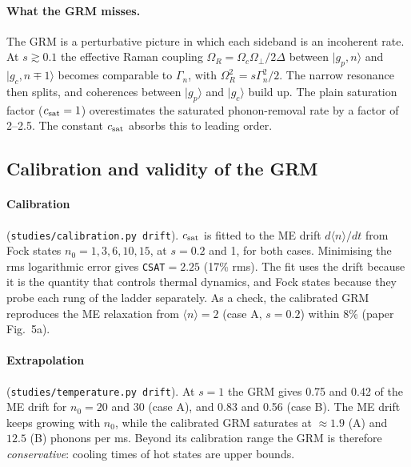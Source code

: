 \documentclass[11pt,a4paper]{article}
\newcommand{\ket}[1]{|#1\rangle}
\newcommand{\gp}{\ket{g_p}}
\newcommand{\gc}{\ket{g_c}}
\newcommand{\Om}{\Omega}
\newcommand{\code}[1]{\texttt{#1}}
\begin{document}
\paragraph{What the GRM misses.} The GRM is a perturbative picture in which each sideband is an incoherent rate. At $s\gtrsim0.1$ the effective Raman coupling $\Om_R=\Om_c\Om_\perp/2\Delta$ between $\ket{g_p,n}$ and $\ket{g_c,n\mp1}$ becomes comparable to $\Gamma_n$, with $\Om_R^2=s\Gamma_n^2/2$. The narrow resonance then splits, and coherences between $\gp$ and $\gc$ build up. The plain saturation factor ($c_{\rm sat}=1$) overestimates the saturated phonon-removal rate by a factor of 2--2.5. The constant $c_{\rm sat}$ absorbs this to leading order.

\subsection{Calibration and validity of the GRM}
\label{sec:calib}
\paragraph{Calibration} (\code{studies/calibration.py drift}). $c_{\rm sat}$ is fitted to the ME drift $d\langle n\rangle/dt$ from Fock states $n_0=1,3,6,10,15$, at $s=0.2$ and 1, for both cases. Minimising the rms logarithmic error gives \code{CSAT}$=2.25$ (17\% rms). The fit uses the drift because it is the quantity that controls thermal dynamics, and Fock states because they probe each rung of the ladder separately. As a check, the calibrated GRM reproduces the ME relaxation from $\langle n\rangle=2$ (case A, $s=0.2$) within 8\% (paper Fig.~5a).

\paragraph{Extrapolation} (\code{studies/temperature.py drift}). At $s=1$ the GRM gives 0.75 and 0.42 of the ME drift for $n_0=20$ and 30 (case A), and 0.83 and 0.56 (case B). The ME drift keeps growing with $n_0$, while the calibrated GRM saturates at $\approx1.9$ (A) and $12.5$ (B) phonons per ms. Beyond its calibration range the GRM is therefore \emph{conservative}: cooling times of hot states are upper bounds.
\end{document}

